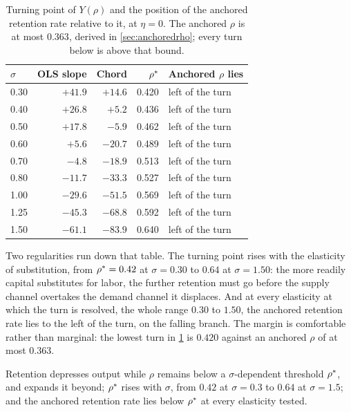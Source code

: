 \begin{table}[htbp]
\centering
\small
\caption{Turning point of $Y(\rho)$ and the position of the anchored retention
rate relative to it, at $\eta = 0$. The anchored $\rho$ is at most $0.363$,
derived in \cref{sec:anchoredrho}; every turn below is above that bound.}
\label{tab:turning}
\begin{tabular}{lrrrl}
\toprule
$\sigma$ & OLS slope & Chord & $\rho^{\ast}$ & Anchored $\rho$ lies\\
\midrule
0.30 & $+41.9$ & $+14.6$ & 0.420 & left of the turn\\
0.40 & $+26.8$ & $+5.2$  & 0.436 & left of the turn\\
0.50 & $+17.8$ & $-5.9$  & 0.462 & left of the turn\\
0.60 & $+5.6$  & $-20.7$ & 0.489 & left of the turn\\
0.70 & $-4.8$  & $-18.9$ & 0.513 & left of the turn\\
0.80 & $-11.7$ & $-33.3$ & 0.527 & left of the turn\\
1.00 & $-29.6$ & $-51.5$ & 0.569 & left of the turn\\
1.25 & $-45.3$ & $-68.8$ & 0.592 & left of the turn\\
1.50 & $-61.1$ & $-83.9$ & 0.640 & left of the turn\\
\bottomrule
\end{tabular}
\end{table}

Two regularities run down that table. The turning point rises with the
elasticity of substitution, from $\rho^{\ast} = 0.42$ at $\sigma = 0.30$ to
$0.64$ at $\sigma = 1.50$: the more readily capital substitutes for labor, the
further retention must go before the supply channel overtakes the demand
channel it displaces. And at every elasticity at which the turn is
resolved, the whole range $0.30$ to $1.50$, the anchored retention rate
lies to the left of the turn, on the falling branch. The margin is
comfortable rather than marginal: the lowest turn in \cref{tab:turning} is
$0.420$ against an anchored $\rho$ of at most $0.363$.

\begin{remark}
Retention depresses output while $\rho$ remains below a
$\sigma$-dependent threshold $\rho^{\ast}$, and expands it beyond; $\rho^{\ast}$
rises with $\sigma$, from $0.42$ at $\sigma = 0.3$ to $0.64$ at
$\sigma = 1.5$; and the anchored retention rate lies below $\rho^{\ast}$ at every
elasticity tested.
\end{remark}

